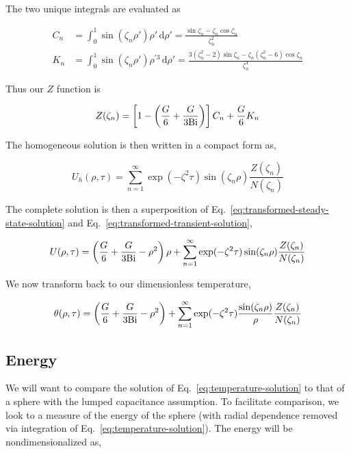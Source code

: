 The two unique integrals are evaluated as

\begin{align*}
    C_n &= \int_0^1\sin(\zeta_n\rho')\rho' \,\mathrm{d}\rho'  = \frac{\sin\zeta_n-\zeta_n\cos\zeta_n}{\zeta_n^2}\\
    K_n &= \int_0^1\sin(\zeta_n\rho')\rho^{'3} \,\mathrm{d}\rho'  = \frac{3(\zeta_n^2-2)\sin\zeta_n - \zeta_n(\zeta_n^2-6)\cos\zeta_n}{\zeta_n^4}
\end{align*}

Thus our $Z$ function is

\begin{equation}
    Z(\zeta_n) = \left[1  - \left(\frac{G}{6} + \frac{G}{3\mathrm{Bi}}\right)\right]C_n + \frac{G}{6}K_n
\end{equation}

The homogeneous solution is then written in a compact form as,

\begin{equation}\label{eq:transformed-transient-solution}
    U_h(\rho,\tau) = \sum_{n=1}^\infty \exp(-\zeta^2 \tau) \sin(\zeta_n \rho) \frac{Z(\zeta_n)}{N(\zeta_n)} 
\end{equation}

The complete solution is then a superposition of Eq.~\ref{eq:transformed-steady-state-solution} and Eq.~\ref{eq:transformed-transient-solution},

\begin{equation}
    U(\rho,\tau) = \left(\frac{G}{6} + \frac{G}{3\mathrm{Bi}}-\rho^2\right)\rho  +   \sum_{n=1}^\infty \exp(-\zeta^2 \tau) \sin(\zeta_n \rho) \frac{Z(\zeta_n)}{N(\zeta_n)} 
\end{equation}

We now transform back to our dimensionless temperature,

\begin{equation}\label{eq:temperature-solution}
    \theta(\rho,\tau) = \left(\frac{G}{6} + \frac{G}{3\mathrm{Bi}}-\rho^2\right)  +   \sum_{n=1}^\infty \exp(-\zeta^2 \tau) \frac{\sin(\zeta_n \rho)}{\rho} \frac{Z(\zeta_n)}{N(\zeta_n)}  
\end{equation}


\subsection{Energy}

We will want to compare the solution of Eq.~\ref{eq:temperature-solution} to that of a sphere with the lumped capacitance assumption. To facilitate comparison, we look to a measure of the energy of the sphere (with radial dependence removed via integration of Eq.~\ref{eq:temperature-solution}). The energy will be nondimensionalized as,

